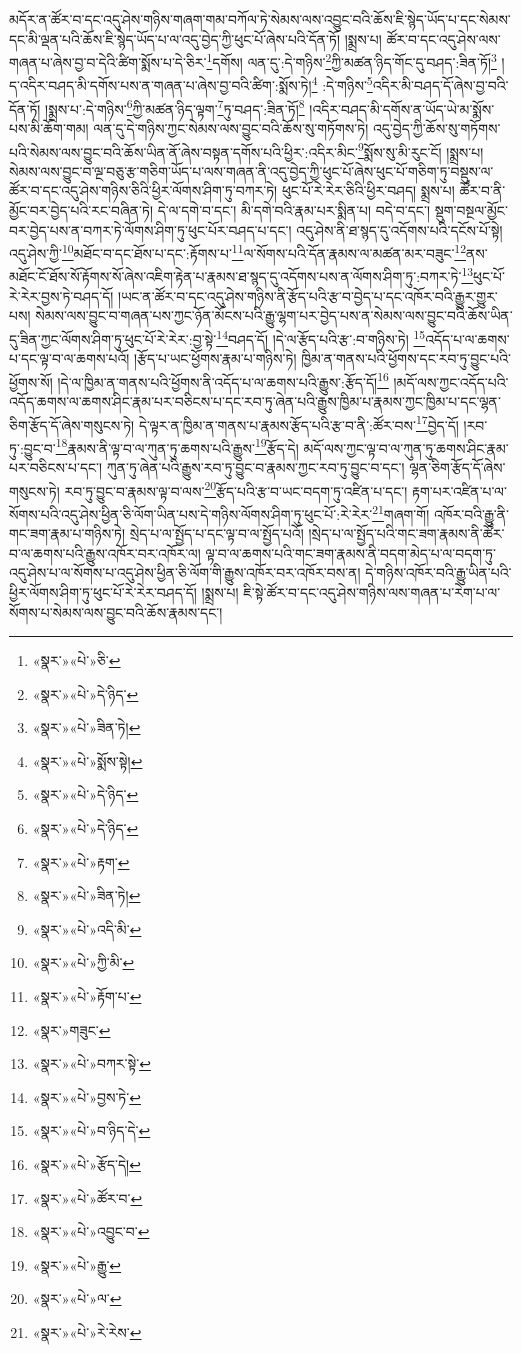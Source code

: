 མདོར་ན་ཚོར་བ་དང་འདུ་ཤེས་གཉིས་གཞག་གམ་བཀོལ་ཏེ་སེམས་ལས་འབྱུང་བའི་ཆོས་ཇི་སྙེད་ཡོད་པ་དང་སེམས་དང་མི་ལྡན་པའི་ཆོས་ཇི་སྙེད་ཡོད་པ་ལ་འདུ་བྱེད་ཀྱི་ཕུང་པོ་ཞེས་པའི་དོན་ཏོ། །སྨྲས་པ། ཚོར་བ་དང་འདུ་ཤེས་ལས་གཞན་པ་ཞེས་བྱ་བ་དེའི་ཚིག་སྨོས་པ་དེ་ཅིར་\footnote{«སྣར་»«པེ་»ཅི་}དགོས། ལན་དུ་:དེ་གཉིས་\footnote{«སྣར་»«པེ་»དེ་ཉིད་}ཀྱི་མཚན་ཉིད་གོང་དུ་བཤད་:ཟིན་ཏོ།\footnote{«སྣར་»«པེ་»ཟིན་ཏེ།} །ད་འདིར་བཤད་མི་དགོས་པས་ན་གཞན་པ་ཞེས་བྱ་བའི་ཚིག་:སྨོས་ཏེ།\footnote{«སྣར་»«པེ་»སྨོས་སྟེ།} :དེ་གཉིས་\footnote{«སྣར་»«པེ་»དེ་ཉིད་}འདིར་མི་བཤད་དོ་ཞེས་བྱ་བའི་དོན་ཏོ། །སྨྲས་པ་:དེ་གཉིས་\footnote{«སྣར་»«པེ་»དེ་ཉིད་}ཀྱི་མཚན་ཉིད་ལྟག་\footnote{«སྣར་»«པེ་»རྟག་}ཏུ་བཤད་:ཟིན་ཏོ།\footnote{«སྣར་»«པེ་»ཟིན་ཏེ།} །འདིར་བཤད་མི་དགོས་ན་ཡོད་ཡེ་མ་སྨོས་པས་མི་ཆོག་གམ། ལན་དུ་དེ་གཉིས་ཀྱང་སེམས་ལས་བྱུང་བའི་ཆོས་སུ་གཏོགས་ཏེ། འདུ་བྱེད་ཀྱི་ཆོས་སུ་གཏོགས་པའི་སེམས་ལས་བྱུང་བའི་ཆོས་ཡིན་ནོ་ཞེས་བསྟན་དགོས་པའི་ཕྱིར་:འདིར་མིང་\footnote{«སྣར་»«པེ་»འདི་མི་}སྨོས་སུ་མི་རུང་ངོ། །སྨྲས་པ། སེམས་ལས་བྱུང་བ་ལྔ་བཅུ་རྩ་གཅིག་ཡོད་པ་ལས་གཞན་ནི་འདུ་བྱེད་ཀྱི་ཕུང་པོ་ཞེས་ཕུང་པོ་གཅིག་ཏུ་བསྡུས་ལ་ཚོར་བ་དང་འདུ་ཤེས་གཉིས་ཅིའི་ཕྱིར་ལོགས་ཤིག་ཏུ་བཀར་ཏེ། ཕུང་པོ་རེ་རེར་ཅིའི་ཕྱིར་བཤད། སྨྲས་པ། ཚོར་བ་ནི་མྱོང་བར་བྱེད་པའི་རང་བཞིན་ཏེ། དེ་ལ་དགེ་བ་དང་། མི་དགེ་བའི་རྣམ་པར་སྨིན་པ། བདེ་བ་དང་། སྡུག་བསྔལ་མྱོང་བར་བྱེད་པས་ན་བཀར་ཏེ་ལོགས་ཤིག་ཏུ་ཕུང་པོར་བཤད་པ་དང་། འདུ་ཤེས་ནི་ཐ་སྙད་དུ་འདོགས་པའི་དངོས་པོ་སྟེ། འདུ་ཤེས་ཀྱི་\footnote{«སྣར་»«པེ་»ཀྱི་མི་}མཐོང་བ་དང་ཐོས་པ་དང་:རྟོགས་པ་\footnote{«སྣར་»«པེ་»རྟོག་པ་}ལ་སོགས་པའི་དོན་རྣམས་ལ་མཚན་མར་བཟུང་\footnote{«སྣར་»གཟུང་}ནས་མཐོང་ངོ་ཐོས་སོ་རྟོགས་སོ་ཞེས་འཇིག་རྟེན་པ་རྣམས་ཐ་སྙད་དུ་འདོགས་པས་ན་ལོགས་ཤིག་ཏུ་:བཀར་ཏེ་\footnote{«སྣར་»«པེ་»བཀར་སྟེ་}ཕུང་པོ་རེ་རེར་བྱས་ཏེ་བཤད་དོ། །ཡང་ན་ཚོར་བ་དང་འདུ་ཤེས་གཉིས་ནི་རྩོད་པའི་རྩ་བ་བྱེད་པ་དང་འཁོར་བའི་རྒྱུར་གྱུར་པས། སེམས་ལས་བྱུང་བ་གཞན་པས་ཀྱང་ཉོན་མོངས་པའི་རྒྱུ་ལྷག་པར་བྱེད་པས་ན་སེམས་ལས་བྱུང་བའི་ཆོས་ཡིན་དུ་ཟིན་ཀྱང་ལོགས་ཤིག་ཏུ་ཕུང་པོ་རེ་རེར་:བྱ་སྟེ་\footnote{«སྣར་»«པེ་»བྱས་ཏེ་}བཤད་དོ། །དེ་ལ་རྩོད་པའི་རྩ་:བ་གཉིས་ཏེ། \footnote{«སྣར་»«པེ་»བ་ཉིད་དེ་}འདོད་པ་ལ་ཆགས་པ་དང་ལྟ་བ་ལ་ཆགས་པའོ། །རྩོད་པ་ཡང་ཕྱོགས་རྣམ་པ་གཉིས་ཏེ། ཁྱིམ་ན་གནས་པའི་ཕྱོགས་དང་རབ་ཏུ་བྱུང་པའི་ཕྱོགས་སོ། །དེ་ལ་ཁྱིམ་ན་གནས་པའི་ཕྱོགས་ནི་འདོད་པ་ལ་ཆགས་པའི་རྒྱུས་:རྩོད་དོ།\footnote{«སྣར་»«པེ་»རྩོད་དེ།} །མདོ་ལས་ཀྱང་འདོད་པའི་འདོད་ཆགས་ལ་ཆགས་ཤིང་རྣམ་པར་བཅིངས་པ་དང་རབ་ཏུ་ཞེན་པའི་རྒྱུས་ཁྱིམ་པ་རྣམས་ཀྱང་ཁྱིམ་པ་དང་ལྷན་ཅིག་རྩོད་དོ་ཞེས་གསུངས་ཏེ། དེ་ལྟར་ན་ཁྱིམ་ན་གནས་པ་རྣམས་རྩོད་པའི་རྩ་བ་ནི་:ཚོར་བས་\footnote{«སྣར་»«པེ་»ཚོར་བ་}བྱེད་དོ། །རབ་ཏུ་:བྱུང་བ་\footnote{«སྣར་»«པེ་»འབྱུང་བ་}རྣམས་ནི་ལྟ་བ་ལ་ཀུན་ཏུ་ཆགས་པའི་རྒྱུས་\footnote{«སྣར་»«པེ་»རྒྱུ་}རྩོད་དེ། མདོ་ལས་ཀྱང་ལྟ་བ་ལ་ཀུན་ཏུ་ཆགས་ཤིང་རྣམ་པར་བཅིངས་པ་དང་། ཀུན་ཏུ་ཞེན་པའི་རྒྱུས་རབ་ཏུ་བྱུང་བ་རྣམས་ཀྱང་རབ་ཏུ་བྱུང་བ་དང་། ལྷན་ཅིག་རྩོད་དོ་ཞེས་གསུངས་ཏེ། རབ་ཏུ་བྱུང་བ་རྣམས་ལྟ་བ་ལས་\footnote{«སྣར་»«པེ་»ལ་}རྩོད་པའི་རྩ་བ་ཡང་བདག་ཏུ་འཛིན་པ་དང་། རྟག་པར་འཛིན་པ་ལ་སོགས་པའི་འདུ་ཤེས་ཕྱིན་ཅི་ལོག་ཡིན་པས་དེ་གཉིས་ལོགས་ཤིག་ཏུ་ཕུང་པོ་:རེ་རེར་\footnote{«སྣར་»«པེ་»རེ་རེས་}གཞག་གོ། འཁོར་བའི་རྒྱུ་ནི་གང་ཟག་རྣམ་པ་གཉིས་ཏེ། སྲེད་པ་ལ་སྤྱོད་པ་དང་ལྟ་བ་ལ་སྤྱོད་པའོ། །སྲེད་པ་ལ་སྤྱོད་པའི་གང་ཟག་རྣམས་ནི་ཚོར་བ་ལ་ཆགས་པའི་རྒྱུས་འཁོར་བར་འཁོར་ལ། ལྟ་བ་ལ་ཆགས་པའི་གང་ཟག་རྣམས་ནི་བདག་མེད་པ་ལ་བདག་ཏུ་འདུ་ཤེས་པ་ལ་སོགས་པ་འདུ་ཤེས་ཕྱིན་ཅི་ལོག་གི་རྒྱུས་འཁོར་བར་འཁོར་བས་ན། དེ་གཉིས་འཁོར་བའི་རྒྱུ་ཡིན་པའི་ཕྱིར་ལོགས་ཤིག་ཏུ་ཕུང་པོ་རེ་རེར་བཤད་དོ། །སྨྲས་པ། ཇི་སྟེ་ཚོར་བ་དང་འདུ་ཤེས་གཉིས་ལས་གཞན་པ་རེག་པ་ལ་སོགས་པ་སེམས་ལས་བྱུང་བའི་ཆོས་རྣམས་དང་། 